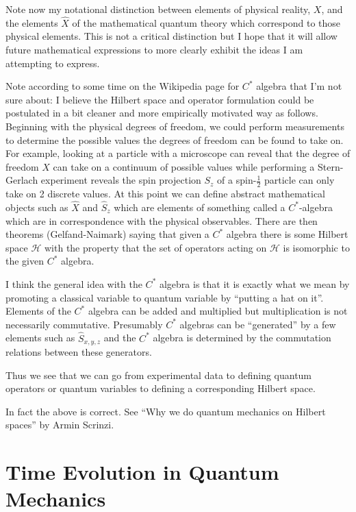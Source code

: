 \documentclass[12pt]{article}
\begin{document}
Note now my notational distinction between elements of physical reality, $X$, and the elements $\hat{X}$ of the mathematical quantum theory which correspond to those physical elements. This is not a critical distinction but I hope that it will allow future mathematical expressions to more clearly  exhibit the ideas I am attempting to express.

Note according to some time on the Wikipedia page for $C^*$ algebra that I'm not sure about: I believe the Hilbert space and operator formulation could be postulated in a bit cleaner and more empirically motivated way as follows. Beginning with the physical degrees of freedom, we could perform measurements to determine the possible values the degrees of freedom can be found to take on. For example, looking at a particle with a microscope can reveal that the degree of freedom $X$ can take on a continuum of possible values while performing a Stern-Gerlach experiment reveals the spin projection $S_z$ of a spin-$\frac{1}{2}$ particle can only take on 2 discrete values. At this point we can define abstract mathematical objects such as $\hat{X}$ and $\hat{S}_z$ which are elements of something called a $C^*$-algebra which are in correspondence with the physical observables. There are then theorems (Gelfand-Naimark) saying that given a $C^*$ algebra there is some Hilbert space $\mathcal{H}$ with the property that the set of operators acting on $\mathcal{H}$ is isomorphic to the given $C^*$ algebra. 

I think the general idea with the $C^*$ algebra is that it is exactly what we mean by promoting a classical variable to quantum variable by ``putting a hat on it''. Elements of the $C^*$ algebra can be added and multiplied but multiplication is not necessarily commutative. Presumably $C^*$ algebras can be ``generated'' by a few elements such as $\hat{S}_{x,y,z}$ and the $C^*$ algebra is determined by the commutation relations between these generators.

Thus we see that we can go from experimental data to defining quantum operators or quantum variables to defining a corresponding Hilbert space.

In fact the above is correct. See ``Why we do quantum mechanics on Hilbert spaces'' by Armin Scrinzi.

\section{Time Evolution in Quantum Mechanics}
\end{document}

